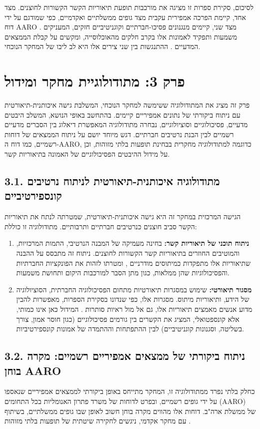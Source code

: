 \documentclass[12pt,a4paper]{article}
\begin{document}
לסיכום, סקירת ספרות זו מציגה את מורכבות תופעת תיאוריות הקשר הקשורות לחוצנים. מצד אחד, קיימת הפרכה אמפירית עקבית מצד גופים ממשלתיים ואקדמיים, כפי שמודגם על ידי דוח AARO \cite{1, 2, 6}. מצד שני, קיימים מנגנונים פסיכו-חברתיים וקוגניטיביים חזקים, המעניקים משמעות ותפקיד לאמונות אלו בקרב חלקים מהאוכלוסייה, ומקשים על קבלת הממצאים המדעיים \cite{3, 4, 5}. ההתנגשות בין שני צירים אלו היא לב ליבו של המחקר הנוכחי.

\section{פרק 3: מתודולוגיית מחקר ומידול}
פרק זה מציג את המתודולוגיה ששימשה למחקר הנוכחי, המשלבת גישה איכותנית-תיאורטית עם ניתוח ביקורתי של נתונים אמפיריים קיימים. בהתחשב באופי הנושא, המשלב היבטים מדעיים, פסיכולוגיים וסוציולוגיים, נבחרה מתודולוגיה המאפשרת דיאלוג בין הסברים מדעיים רשמיים לבין הבנת נרטיבים חברתיים. דגש מיוחד יושם על ניתוח הממצאים של דוחות רשמיים, כמו דוח ה-AARO, כדוגמה למתודולוגיה מחקרית בבחינת תופעות בלתי מזוהות, וכן על מידול ההיבטים הפסיכולוגיים של האמונה בתיאוריות קשר.

\subsection{3.1. מתודולוגיה איכותנית-תיאורטית לניתוח נרטיבים קונספירטיביים}
הגישה המרכזית במחקר זה היא גישה איכותנית-תיאורטית, שמטרתה לנתח את תיאוריות הקשר סביב חוצנים כנרטיבים חברתיים ותרבותיים. מתודולוגיה זו כוללת:

\begin{enumerate}
    \item \textbf{ניתוח תוכני של תיאוריות קשר:} בחינה מעמיקה של המבנה הנרטיבי, התמות המרכזיות, והמוטיבים החוזרים בתיאוריות קשר הקשורות לחוצנים. ניתוח זה מתבסס על ההבנה שתיאוריות אלו מתפקדות כמיתוסים מודרניים \cite{3}, ומטרתו לזהות את הפונקציות החברתיות והפסיכולוגיות שהן ממלאות, כגון מתן הסבר למורכבות היקום ותחושת משמעות.
    \item \textbf{מסגור תיאורטי:} שימוש במסגרות תיאורטיות מתחום הפסיכולוגיה החברתית, הסוציולוגיה של הידע, ותיאוריות מיתוס. מסגרות אלו, כפי שנדונו בסקירת הספרות, מאפשרות להבין מדוע אנשים מאמצים תיאוריות אלו, גם אל מול ראיות סותרות \cite{3, 4, 5}. המידול כאן אינו כמותי, אלא קונספטואלי, המציג את הקשרים בין גורמים פסיכולוגיים (כגון חוסר אמון, צורך בשליטה, וסגנונות קוגניטיביים) לבין ההתפתחות וההתמדה של אמונות קונספירטיביות.
\end{enumerate}

\subsection{3.2. ניתוח ביקורתי של ממצאים אמפיריים רשמיים: מקרה בוחן AARO}
כחלק בלתי נפרד ממתודולוגיה זו, המחקר מתייחס באופן ביקורתי לממצאים אמפיריים שנאספו על ידי גופים רשמיים, ובפרט לדוחות של משרד פתרון האנומליות בכל התחומים (AARO) של ממשלת ארה"ב. דוחות אלו מהווים מקרה בוחן חשוב לאופן שבו גופים ממשלתיים, בשיתוף עם מחקר אקדמי, ניגשים לחקירה שיטתית של תופעות בלתי מזוהות \cite{2}.
\end{document}
